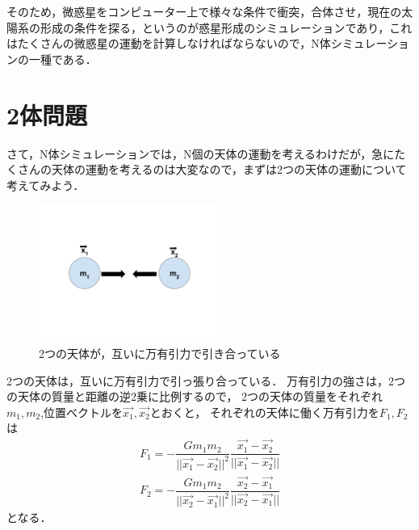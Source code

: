 そのため，微惑星をコンピューター上で様々な条件で衝突，合体させ，現在の太陽系の形成の条件を探る，というのが惑星形成のシミュレーションであり，これはたくさんの微惑星の運動を計算しなければならないので，N体シミュレーションの一種である．

\section{2体問題}
さて，N体シミュレーションでは，N個の天体の運動を考えるわけだが，急にたくさんの天体の運動を考えるのは大変なので，まずは2つの天体の運動について考えてみよう．
\begin{figure}[htbp]
\centering
\includegraphics[width=6cm]{img/2body.png}
\caption{2つの天体が，互いに万有引力で引き合っている}
\end{figure}
2つの天体は，互いに万有引力で引っ張り合っている．
万有引力の強さは，2つの天体の質量と距離の逆2乗に比例するので，
2つの天体の質量をそれぞれ$m_1,m_2$,位置ベクトルを$\vec{x_1},\vec{x_2}$とおくと，
それぞれの天体に働く万有引力を$F_1,F_2$は
\begin{align}
F_1 = - \dfrac{G m_1 m_2}{||\vec{x_1}-\vec{x_2}||^2} \dfrac{\vec{x_1}-\vec{x_2}}{||\vec{x_1}-\vec{x_2}||} \\
F_2 = - \dfrac{G m_1 m_2}{||\vec{x_2}-\vec{x_1}||^2} \dfrac{\vec{x_2}-\vec{x_1}}{||\vec{x_2}-\vec{x_1}||}
\end{align}
となる．

